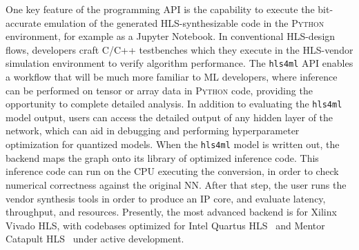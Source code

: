 \documentclass[sigconf]{acmart}
\newcommand{\hlsfml}{\texttt{hls4ml}\xspace}
\begin{document}
One key feature of the programming API is the capability to execute the bit-accurate emulation of the generated HLS-synthesizable code in the \textsc{Python} environment, for example as a Jupyter Notebook.
In conventional HLS-design flows, developers craft \textsc{C/C++} testbenches which they execute in the HLS-vendor simulation environment to verify algorithm performance. 
The \hlsfml API enables a workflow that will be much more familiar to ML developers, where inference can be performed on tensor or array data in \textsc{Python} code, providing the opportunity to complete detailed analysis.
In addition to evaluating the \hlsfml model output, users can access the detailed output of any hidden layer of the network, which can aid in debugging and performing hyperparameter optimization for quantized models.
When the \hlsfml model is written out, the backend maps the graph onto its library of optimized inference code. 
This inference code can run on the CPU executing the conversion, in order to check numerical correctness against the original NN. 
After that step, the user runs the vendor synthesis tools in order to produce an IP core, and evaluate latency, throughput, and resources.
Presently, the most advanced backend is for Xilinx Vivado HLS, with codebases optimized for Intel Quartus HLS~\cite{quartus2020} and Mentor Catapult HLS~\cite{catapulthls2020} under active development.
\end{document}
